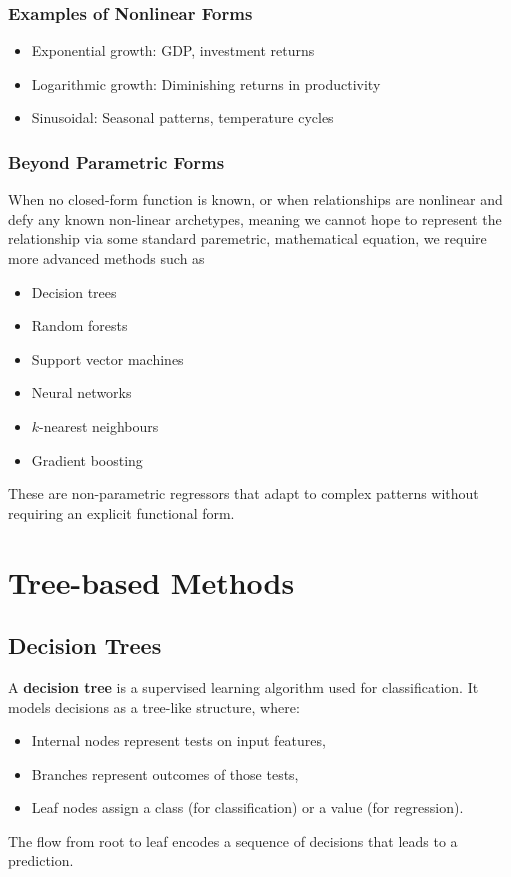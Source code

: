 \documentclass[9pt]{extarticle}
\begin{document}
\subsubsection*{Examples of Nonlinear Forms}

\begin{itemize}
    \item Exponential growth: GDP, investment returns
    \item Logarithmic growth: Diminishing returns in productivity
    \item Sinusoidal: Seasonal patterns, temperature cycles
\end{itemize}

\subsubsection*{Beyond Parametric Forms}

When no closed-form function is known, or when relationships are nonlinear 
and defy any known non-linear archetypes, meaning we cannot 
hope to represent the relationship via some standard paremetric, mathematical 
equation, we require more 
advanced methods such as
\begin{itemize}
    \item Decision trees
    \item Random forests
    \item Support vector machines
    \item Neural networks
    \item $k$-nearest neighbours
    \item Gradient boosting
\end{itemize}

These are non-parametric regressors that adapt to complex patterns 
without requiring an explicit functional form.

\section{Tree-based Methods}

\subsection{Decision Trees}


A \textbf{decision tree} is a 
supervised learning algorithm used for classification. 
It models decisions as a tree-like structure, where:

\begin{itemize}
    \item Internal nodes represent tests on input features,
    \item Branches represent outcomes of those tests,
    \item Leaf nodes assign a class (for classification) or a value (for regression).
\end{itemize}
The flow from root to leaf encodes a sequence of decisions that leads to a prediction.
\end{document}
